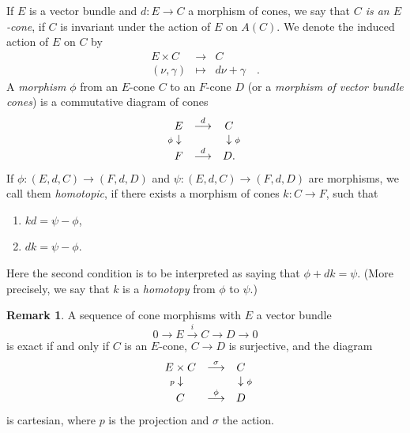 \documentclass[11pt]{article}
\theoremstyle{plain}
\theoremstyle{definition}
\newtheorem{rmkp}{Remark}\renewcommand{\thermkp}{}
\newenvironment{rmk}{\begin{rmkp}\normalfont}{\end{rmkp}}
\newcommand{\ldiag}[1]
       {\makebox[0cm]{\({\scriptstyle#1}\downarrow\phantom{\scriptstyle#1}\)}}
\newcommand{\rdiag}[1]
       {\makebox[0cm]{\(\phantom{\scriptstyle#1}\downarrow{\scriptstyle#1}\)}}
\newcommand{\comdia}[9]{
\begin{array}{ccc}
#1 & \stackrel{#2}{\longrightarrow} & #3 \\
\ldiag{#4} & #5 & \rdiag{#6} \\
#7 & \stackrel{#8}{\longrightarrow} & #9
\end{array}}
\newcommand{\ses}[5]
{0\longrightarrow#1\stackrel{#2}{ \longrightarrow}#3\stackrel{#4}{
\longrightarrow}#5\longrightarrow0}
\theoremstyle{plain}
\theoremstyle{definition}
\theoremstyle{remark}
\begin{document}
If \(E\) is a vector bundle and \(d:E\rightarrow C\) a morphism of cones, we say
that {\em \(C\) is an
\(E\)-cone}, if \(C\) is invariant under the action of \(E\) on \(A(C)\). We denote the
induced action of
\(E\) on \(C\) by
\begin{eqnarray*} E\times C & \longrightarrow & C \\ (\nu,\gamma) & \longmapsto
& d\nu+\gamma\quad.
\end{eqnarray*}
A {\em morphism }\(\phi\) from an \(E\)-cone \(C\) to an \(F\)-cone \(D\) (or a
{\em morphism of vector bundle cones}) is a
commutative diagram of cones
\[
\comdia{E}{d}{C}{\phi}{}{\phi}{F}{d}{D.}
\]
If
\(\phi:(E,d,C)\rightarrow(F,d,D)\)
and \(\psi:(E,d,C)\rightarrow(F,d,D)\) are morphisms, we call them {\em
homotopic}, if there exists a morphism of cones \(k:C\rightarrow F\), such that
\begin{enumerate}
\item \(kd=\psi-\phi\),
\item \(dk=\psi-\phi\).
\end{enumerate} Here the second condition is to be interpreted as saying that
\(\phi+dk=\psi\). (More precisely, we say that \(k\) is a {\em homotopy }from
\(\phi\)
to \(\psi\).)

\begin{rmk} A sequence of cone morphisms with \(E\) a vector bundle
\[
\ses E{i}C{}D
\]
is exact if and only if \(C\) is an \(E\)-cone, \(C\to D\) is
surjective, and the diagram
\[
\comdia{E\times
C}{\sigma}{C}{p}{}{\phi}{C}{\phi}{D}
\]
is cartesian, where
\(p\) is the projection and
\(\sigma\) the action.
\end{rmk}
\end{document}
